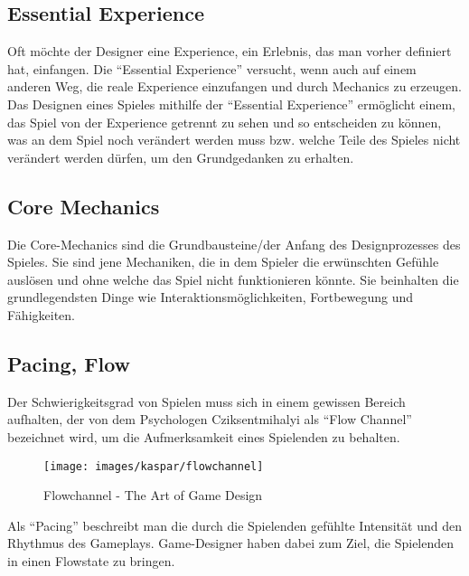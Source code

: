 \subsection{Essential Experience}

Oft möchte der Designer eine Experience, ein Erlebnis, das man vorher definiert hat, einfangen. Die "`Essential Experience"' versucht, wenn auch auf einem anderen Weg, die reale Experience einzufangen und durch Mechanics zu erzeugen. Das Designen eines Spieles mithilfe der "`Essential Experience"' ermöglicht einem, das Spiel von der Experience getrennt zu sehen und so entscheiden zu können, was an dem Spiel noch verändert werden muss bzw. welche Teile des Spieles nicht verändert werden dürfen, um den Grundgedanken zu erhalten\cite[S.55]{_art_of_gamedesign}.

\subsection{Core Mechanics}

Die Core-Mechanics sind die Grundbausteine/der Anfang des Designprozesses des Spieles. Sie sind jene Mechaniken, die in dem Spieler die erwünschten Gefühle auslösen und ohne welche das Spiel nicht funktionieren könnte. Sie beinhalten die grundlegendsten Dinge wie Interaktionsmöglichkeiten, Fortbewegung und Fähigkeiten\cite[S.330]{_game_design_workshop}.

\subsection{Pacing, Flow\label{_flow}}

Der Schwierigkeitsgrad von Spielen muss sich in einem gewissen Bereich aufhalten, der von dem Psychologen Cziksentmihalyi als "`Flow Channel"' bezeichnet wird, um die Aufmerksamkeit eines Spielenden zu behalten\cite[S.205]{_art_of_gamedesign}.

\begin{figure}[H]
	\centering
	\texttt{[image: images/kaspar/flowchannel]}
	\caption{Flowchannel - The Art of Game Design\cite{_art_of_gamedesign}}
\end{figure}

Als "`Pacing"' beschreibt man die durch die Spielenden gefühlte Intensität und den Rhythmus des Gameplays\cite{_the_level_design_book}. Game-Designer haben dabei zum Ziel, die Spielenden in einen Flowstate zu bringen.

